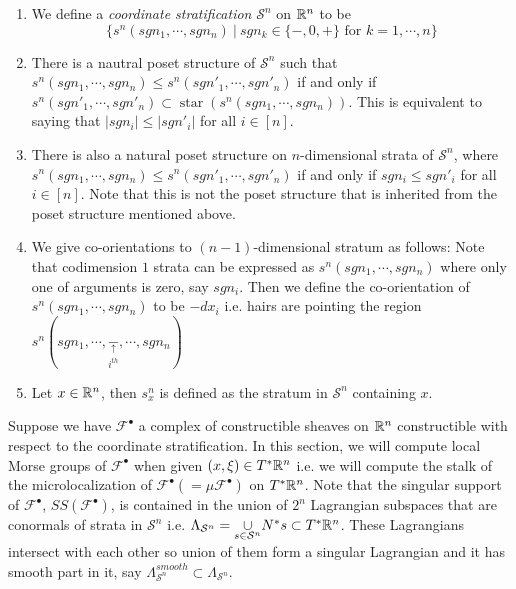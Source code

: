 \begin{definition}\label{coordinate}
\begin{enumerate}
\item We define a \emph{coordinate stratification} $\mathcal{S}^n$ on $\mathbb{R}^n$ to be 
\[
\{s^n(sgn_1,\cdots, sgn_n) ~|~ sgn_k \in \{-,0,+\}\text{ for }k=1,\cdots,n\}
\]

\item There is a nautral poset structure of $\mathcal{S}^n$ such that $s^n(sgn_1,\cdots, sgn_n)\leq s^n(sgn'_1,\cdots, sgn'_n)$ if and only if $s^n(sgn'_1,\cdots, sgn'_n) \subset \operatorname{star}(s^n(sgn_1,\cdots, sgn_n))$. This is equivalent to saying that $|sgn_i| \leq |sgn'_i|$ for all $i\in [n]$.

\item There is also a natural poset structure on $n$-dimensional strata of $\mathcal{S}^n$, where $s^n(sgn_1,\cdots, sgn_n)\leq s^n(sgn'_1,\cdots, sgn'_n)$ if and only if $sgn_i \leq sgn'_i$ for all $i\in [n]$. Note that this is not the poset structure that is inherited from the poset structure mentioned above.

\item We give co-orientations to $(n-1)$-dimensional stratum as follows: Note that codimension $1$ strata can be expressed as $s^n(sgn_1,\cdots,sgn_n)$ where only one of arguments is zero, say $sgn_i$. Then we define the co-orientation of $s^n(sgn_1,\cdots,sgn_n)$ to be $-dx_i$ i.e. hairs are pointing the region $s^n(sgn_1,\cdots,\underset{i^{th}}{\underset{\uparrow}{-}},\cdots,sgn_n)$

\item Let $x\in \mathbb{R}^n$, then $s^n_x$ is defined as the stratum in $\mathcal{S}^n$ containing $x$.
\end{enumerate}
\end{definition}
Suppose we have 
$\mathscr{F}^\bullet$ a complex of constructible sheaves on $\mathbb{R}^n$ constructible with respect to the coordinate stratification. In this section, we will compute local Morse groups of $\mathscr{F}^\bullet$ when given $(x,\xi)\in T^*\mathbb{R}^n$ i.e. we will compute the stalk of the microlocalization of $\mathscr{F}^\bullet(=\mu \mathscr{F}^\bullet)$ on $T^*\mathbb{R}^n$.
Note that the singular support of $\mathscr{F}^\bullet$, $SS(\mathscr{F}^\bullet)$, is contained in the union of $2^n$ Lagrangian subspaces that are conormals of strata in $\mathcal{S}^n$ i.e. $\Lambda_{\mathcal{S}^n} = \underset{s\in \mathcal{S}^n}{\cup} N^*s \subset T^*\mathbb{R}^n$. These Lagrangians intersect with each other so union of them form a singular Lagrangian and it has smooth part in it, say $\Lambda_{\mathcal{S}^n}^{smooth}\subset \Lambda_{\mathcal{S}^n}$.
